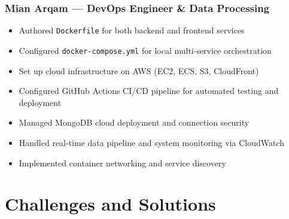 \documentclass[12pt, a4paper]{report}
\begin{document}
\subsection{Mian Arqam --- DevOps Engineer \& Data Processing}

\begin{itemize}
  \item Authored \texttt{Dockerfile} for both backend and frontend services
  \item Configured \texttt{docker-compose.yml} for local multi-service orchestration
  \item Set up cloud infrastructure on AWS (EC2, ECS, S3, CloudFront)
  \item Configured GitHub Actions CI/CD pipeline for automated testing and deployment
  \item Managed MongoDB cloud deployment and connection security
  \item Handled real-time data pipeline and system monitoring via CloudWatch
  \item Implemented container networking and service discovery
\end{itemize}

\chapter{Challenges and Solutions}
\end{document}
